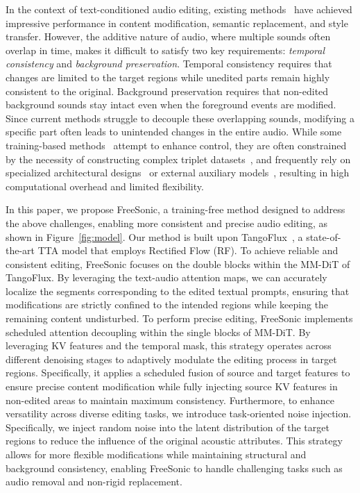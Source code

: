 In the context of text-conditioned audio editing, existing methods~\cite{jia2025audioeditor,xu2024prompt,manor2024zero} have achieved impressive performance in content modification, semantic replacement, and style transfer. However, the additive nature of audio, where multiple sounds often overlap in time, makes it difficult to satisfy two key requirements: \textit{temporal consistency} and \textit{background preservation}. Temporal consistency requires that changes are limited to the target regions while unedited parts remain highly consistent to the original. Background preservation requires that non-edited background sounds stay intact even when the foreground events are modified. Since current methods struggle to decouple these overlapping sounds, modifying a specific part often leads to unintended changes in the entire audio.
While some training-based methods~\cite{wang2023audit} attempt to enhance control, they are often constrained by the necessity of constructing complex triplet datasets~\cite{ungersbock2025sao}, and frequently rely on specialized architectural designs~\cite{tao2025mmedit,gao2025rfm} or external auxiliary models~\cite{lan2025guiding}, resulting in high computational overhead and limited flexibility.

In this paper, we propose FreeSonic, a training-free method designed to address the above challenges, enabling more consistent and precise audio editing, as shown in Figure~\ref{fig:model}. Our method is built upon TangoFlux~\cite{hung2024tangoflux}, a state-of-the-art TTA model that employs Rectified Flow (RF). To achieve reliable and consistent editing, FreeSonic focuses on the double blocks within the MM-DiT of TangoFlux. By leveraging the text-audio attention maps, we can accurately localize the segments corresponding to the edited textual prompts, ensuring that modifications are strictly confined to the intended regions while keeping the remaining content undisturbed. To perform precise editing, FreeSonic implements scheduled attention decoupling within the single blocks of MM-DiT. By leveraging KV features and the temporal mask, this strategy operates across different denoising stages to adaptively modulate the editing process in target regions. Specifically, it applies a scheduled fusion of source and target features to ensure precise content modification while fully injecting source KV features in non-edited areas to maintain maximum consistency. Furthermore, to enhance versatility across diverse editing tasks, we introduce task-oriented noise injection. Specifically, we inject random noise into the latent distribution of the target regions to reduce the influence of the original acoustic attributes. This strategy allows for more flexible modifications while maintaining structural and background consistency, enabling FreeSonic to handle challenging tasks such as audio removal and non-rigid replacement.

